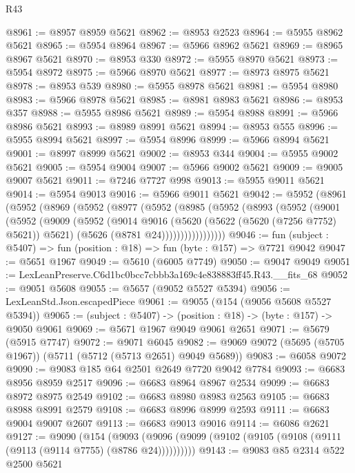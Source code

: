\begin{lexlean}{R43}
\begin{coremodule}
@8961 := @8957 @8959 @5621
@8962 := @8953 @2523
@8964 := @5955 @8962 @5621
@8965 := @5954 @8964
@8967 := @5966 @8962 @5621
@8969 := @8965 @8967 @5621
@8970 := @8953 @330
@8972 := @5955 @8970 @5621
@8973 := @5954 @8972
@8975 := @5966 @8970 @5621
@8977 := @8973 @8975 @5621
@8978 := @8953 @539
@8980 := @5955 @8978 @5621
@8981 := @5954 @8980
@8983 := @5966 @8978 @5621
@8985 := @8981 @8983 @5621
@8986 := @8953 @357
@8988 := @5955 @8986 @5621
@8989 := @5954 @8988
@8991 := @5966 @8986 @5621
@8993 := @8989 @8991 @5621
@8994 := @8953 @555
@8996 := @5955 @8994 @5621
@8997 := @5954 @8996
@8999 := @5966 @8994 @5621
@9001 := @8997 @8999 @5621
@9002 := @8953 @344
@9004 := @5955 @9002 @5621
@9005 := @5954 @9004
@9007 := @5966 @9002 @5621
@9009 := @9005 @9007 @5621
@9011 := @7246 @7727 @998
@9013 := @5955 @9011 @5621
@9014 := @5954 @9013
@9016 := @5966 @9011 @5621
@9042 := @5952
    (@8961
      (@5952
        (@8969
          (@5952
            (@8977
              (@5952
                (@8985
                  (@5952
                    (@8993
                      (@5952
                        (@9001
                          (@5952
                            (@9009
                              (@5952
                                (@9014
                                  @9016
                                  (@5620 (@5622 (@5620 (@7256 @7752) @5621)) @5621)
                                  (@5626 (@8781 @24)))))))))))))))))
@9046 := fun (subject : @5407) => fun (position : @18) => fun (byte : @157) => @7721 @9042
@9047 := @5651 @1967
@9049 := @5610 (@6005 @7749)
@9050 := @9047 @9049
@9051 := LexLeanPreserve.C6d1bc0bcc7cbbb3a169c4e838883ff45.R43.__fits_68
@9052 := @9051 @5608
@9055 := @5657 (@9052 @5527 @5394)
@9056 := LexLeanStd.Json.escapedPiece
@9061 := @9055 (@154 (@9056 @5608 @5527 @5394))
@9065 := (subject : @5407) -> (position : @18) -> (byte : @157) -> @9050 @9061
@9069 := @5671 @1967 @9049 @9061 @2651
@9071 := @5679 (@5915 @7747)
@9072 := @9071 @6045
@9082 := @9069 @9072 (@5695 (@5705 @1967)) (@5711 (@5712 (@5713 @2651) @9049 @5689))
@9083 := @6058 @9072
@9090 := @9083 @185 @64 @2501 @2649 @7720 @9042 @7784
@9093 := @6683 @8956 @8959 @2517
@9096 := @6683 @8964 @8967 @2534
@9099 := @6683 @8972 @8975 @2549
@9102 := @6683 @8980 @8983 @2563
@9105 := @6683 @8988 @8991 @2579
@9108 := @6683 @8996 @8999 @2593
@9111 := @6683 @9004 @9007 @2607
@9113 := @6683 @9013 @9016
@9114 := @6086 @2621
@9127 := @9090
    (@154 (@9093 (@9096 (@9099 (@9102 (@9105 (@9108 (@9111 (@9113 (@9114 @7755) (@8786 @24))))))))))
@9143 := @9083
    @85
    @2314
    @522
    @2500
    @5621

\end{coremodule}
\end{lexlean}
